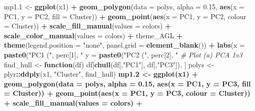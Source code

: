 \documentclass[
]{article}
\newenvironment{Shaded}{\begin{snugshade}}{\end{snugshade}}
\newcommand{\CommentTok}[1]{\textcolor[rgb]{0.56,0.35,0.01}{\textit{#1}}}
\newcommand{\ControlFlowTok}[1]{\textcolor[rgb]{0.13,0.29,0.53}{\textbf{#1}}}
\newcommand{\DataTypeTok}[1]{\textcolor[rgb]{0.13,0.29,0.53}{#1}}
\newcommand{\DecValTok}[1]{\textcolor[rgb]{0.00,0.00,0.81}{#1}}
\newcommand{\FloatTok}[1]{\textcolor[rgb]{0.00,0.00,0.81}{#1}}
\newcommand{\KeywordTok}[1]{\textcolor[rgb]{0.13,0.29,0.53}{\textbf{#1}}}
\newcommand{\NormalTok}[1]{#1}
\newcommand{\OperatorTok}[1]{\textcolor[rgb]{0.81,0.36,0.00}{\textbf{#1}}}
\newcommand{\StringTok}[1]{\textcolor[rgb]{0.31,0.60,0.02}{#1}}
\begin{document}
\begin{Shaded}
\begin{Highlighting}[]
{{{{{{{{{{{{{{\NormalTok{mp1}\FloatTok{.1}\NormalTok{ <-}\StringTok{ }\KeywordTok{ggplot}\NormalTok{(x1) }\OperatorTok{+}
\StringTok{  }\KeywordTok{geom_polygon}\NormalTok{(}\DataTypeTok{data =}\NormalTok{ polys, }\DataTypeTok{alpha =} \FloatTok{0.15}\NormalTok{, }\KeywordTok{aes}\NormalTok{(}\DataTypeTok{x =}\NormalTok{ PC1, }\DataTypeTok{y =}\NormalTok{ PC2, }\DataTypeTok{fill =}\NormalTok{ Cluster)) }\OperatorTok{+}
\StringTok{  }\KeywordTok{geom_point}\NormalTok{(}\KeywordTok{aes}\NormalTok{(}\DataTypeTok{x =}\NormalTok{ PC1, }\DataTypeTok{y =}\NormalTok{ PC2, }\DataTypeTok{colour =}\NormalTok{ Cluster)) }\OperatorTok{+}
\StringTok{  }\KeywordTok{scale_fill_manual}\NormalTok{(}\DataTypeTok{values =}\NormalTok{ colors) }\OperatorTok{+}
\StringTok{  }\KeywordTok{scale_color_manual}\NormalTok{(}\DataTypeTok{values =}\NormalTok{ colors) }\OperatorTok{+}
\StringTok{  }\NormalTok{theme_AGL }\OperatorTok{+}\StringTok{ }
\StringTok{  }\KeywordTok{theme}\NormalTok{(}\DataTypeTok{legend.position =} \StringTok{"none"}\NormalTok{, }\DataTypeTok{panel.grid =} \KeywordTok{element_blank}\NormalTok{()) }\OperatorTok{+}
\StringTok{  }\KeywordTok{labs}\NormalTok{(}\DataTypeTok{x =} \KeywordTok{paste0}\NormalTok{(}\StringTok{"PC1 ("}\NormalTok{, perc[}\DecValTok{1}\NormalTok{], }\StringTok{"%
       \DataTypeTok{y =} \KeywordTok{paste0}\NormalTok{(}\StringTok{"PC2 ("}\NormalTok{, perc[}\DecValTok{2}\NormalTok{], }\StringTok{"%
\CommentTok{# Plot (a) PCA 1v3}
\NormalTok{find_hull <-}\StringTok{ }\ControlFlowTok{function}\NormalTok{(df) df[}\KeywordTok{chull}\NormalTok{(df[,}\StringTok{"PC1"}\NormalTok{], df[,}\StringTok{"PC3"}\NormalTok{]), ]}
\NormalTok{polys <-}\StringTok{ }\NormalTok{plyr}\OperatorTok{::}\KeywordTok{ddply}\NormalTok{(x1, }\StringTok{"Cluster"}\NormalTok{, find_hull) }\OperatorTok{%
\NormalTok{mp1}\FloatTok{.2}\NormalTok{ <-}\StringTok{ }\KeywordTok{ggplot}\NormalTok{(x1) }\OperatorTok{+}
\StringTok{  }\KeywordTok{geom_polygon}\NormalTok{(}\DataTypeTok{data =}\NormalTok{ polys, }\DataTypeTok{alpha =} \FloatTok{0.15}\NormalTok{, }\KeywordTok{aes}\NormalTok{(}\DataTypeTok{x =}\NormalTok{ PC1, }\DataTypeTok{y =}\NormalTok{ PC3, }\DataTypeTok{fill =}\NormalTok{ Cluster)) }\OperatorTok{+}
\StringTok{  }\KeywordTok{geom_point}\NormalTok{(}\KeywordTok{aes}\NormalTok{(}\DataTypeTok{x =}\NormalTok{ PC1, }\DataTypeTok{y =}\NormalTok{ PC3, }\DataTypeTok{colour =}\NormalTok{ Cluster)) }\OperatorTok{+}
\StringTok{  }\KeywordTok{scale_fill_manual}\NormalTok{(}\DataTypeTok{values =}\NormalTok{ colors) }\OperatorTok{+}
}}}}}}}}}}}}}}}}}
\end{Highlighting}
\end{Shaded}
\end{document}
